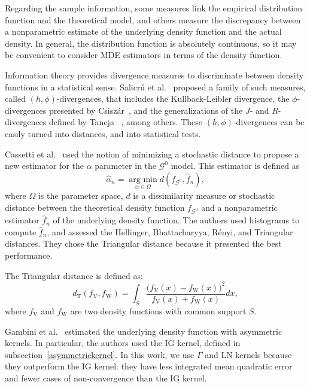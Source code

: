 \documentclass[twocolumn]{svjour3}
\newcommand{\argmin}{\operatorname*{\text{arg min }}}
\begin{document}
Regarding the sample information, some measures link the empirical distribution function and the theoretical model, and others measure the discrepancy between a nonparametric estimate of the underlying density function and the actual density. 
In general, the distribution function is absolutely continuous, so it may be convenient to consider MDE estimators in terms of the density function. 

Information theory provides divergence measures to discriminate between density functions in a statistical sense. 
Salicr\'u et al.~\cite{Salicru1994} proposed a family of such measures, called $(h,\phi)$-divergences, that includes the Kullback-Leibler divergence,  
the $\phi$-divergences presented by Csisz\'ar~\cite{Csiszar1967}, 
and the generalizations of the $J$- and $R$-divergences defined by Taneja ~\cite{Taneja1989}, among others.
These $(h,\phi)$-divergences can be easily turned into distances, and into statistical tests.

Cassetti et al.~\cite{APSAR2013ParameterEstimationStochasticDistances} used the notion of minimizing a stochastic distance to propose a new estimator for the $\alpha$ parameter in the $\mathcal{G}^0$ model. 
This estimator is defined as
\begin{equation}
\widehat{\alpha}_n=\argmin_{\alpha\in\Omega} d(f_{\mathcal{G}^0}, \widehat{f}_n),
\label{MDE}
\end{equation}
where $\Omega$ is the parameter space, $d$ is a dissimilarity measure or stochastic distance between the theoretical density function $f_{\mathcal{G}^0}$ and a nonparametric estimator $\widehat{f}_n$ of the underlying density function.
The authors used histograms to compute $\widehat{f}_n$, and assessed the Hellinger, Bhattacharyya, R\'enyi, and Triangular distances. 
They chose the Triangular distance because it presented the best performance.

The Triangular distance is defined as:
\begin{equation}
d_{\text{{T}}}(f_{\text{{V}}},f_{\text{{W}}})=\int_{S}\frac{\big(f_{\text{{V}}}(x)-f_{\text{{W}}}(x)\big)^2}{f_{\text{{V}}}(x)+f_{\text{{W}}}(x)}dx,
\label{DT}
\end{equation}
where $f_{\text{{V}}}$ and $f_{\text{{W}}}$ are two density functions with common support $S$.

Gambini et al.~\cite{gambini2015} estimated the underlying density function with asymmetric kernels.
In particular, the authors used the IG kernel, defined in subsection~\ref{asymmetrickernel}. 
In this work, we use $\Gamma$ and LN kernels because they outperform the IG kernel: they have less integrated mean quadratic error and fewer cases of non-convergence than the IG kernel.
\end{document}
